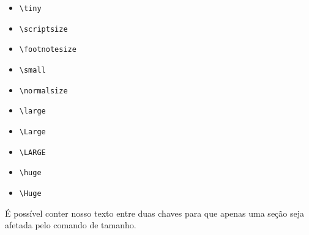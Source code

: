 \documentclass[11pt,a4paper,oneside]{article}
\begin{document}
\begin{itemize}
  \item\verb+\tiny+
  \item\verb+\scriptsize+
  \item\verb+\footnotesize+
  \item\verb+\small+
  \item\verb+\normalsize+
  \item\verb+\large+
  \item\verb+\Large+
  \item\verb+\LARGE+
  \item\verb+\huge+
  \item\verb+\Huge+
\end{itemize}

{\Large É possível conter nosso texto entre duas chaves} para que apenas uma
seção seja afetada pelo comando de tamanho.
\end{document}

